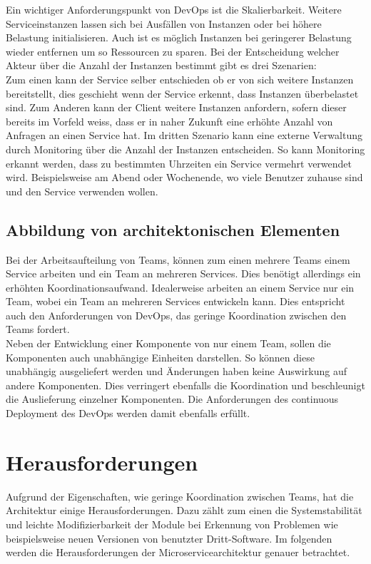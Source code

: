 Ein wichtiger Anforderungspunkt von DevOps ist die Skalierbarkeit. Weitere Serviceinstanzen lassen sich bei Ausfällen von Instanzen oder bei höhere Belastung initialisieren. Auch ist es möglich Instanzen bei geringerer Belastung wieder entfernen um so Ressourcen zu sparen. Bei der Entscheidung welcher Akteur über die Anzahl der Instanzen bestimmt gibt es drei Szenarien:\\
Zum einen kann der Service selber entschieden ob er von sich weitere Instanzen bereitstellt, dies geschieht wenn der Service erkennt, dass Instanzen überbelastet sind. Zum Anderen kann der Client weitere Instanzen anfordern, sofern dieser bereits im Vorfeld weiss, dass er in naher Zukunft eine erhöhte Anzahl von Anfragen an einen Service hat. Im dritten Szenario kann eine externe Verwaltung durch Monitoring über die Anzahl der Instanzen entscheiden. So kann Monitoring erkannt werden, dass zu bestimmten Uhrzeiten ein Service vermehrt verwendet wird. Beispielsweise am Abend oder Wochenende, wo viele Benutzer zuhause sind und den Service verwenden wollen. 

\subsection{Abbildung von architektonischen Elementen}

Bei der Arbeitsaufteilung von Teams, können zum einen mehrere Teams  einem Service arbeiten und ein Team an mehreren Services. Dies benötigt allerdings ein erhöhten Koordinationsaufwand. Idealerweise arbeiten an einem Service nur ein Team, wobei ein Team an mehreren Services entwickeln kann. Dies entspricht auch den Anforderungen von DevOps, das geringe Koordination zwischen den Teams fordert.\\

Neben der Entwicklung einer Komponente von nur einem Team, sollen die Komponenten auch unabhängige Einheiten darstellen. So können diese unabhängig ausgeliefert werden und Änderungen haben keine Auswirkung auf andere Komponenten. Dies verringert ebenfalls die Koordination und beschleunigt die Auslieferung einzelner Komponenten. Die Anforderungen des continuous Deployment des DevOps werden damit ebenfalls erfüllt. 


\section{Herausforderungen}

Aufgrund der Eigenschaften, wie geringe Koordination zwischen Teams, hat die Architektur einige Herausforderungen. Dazu zählt zum einen die Systemstabilität und leichte Modifizierbarkeit der Module bei Erkennung von Problemen wie beispielsweise neuen Versionen von benutzter Dritt-Software. Im folgenden werden die Herausforderungen der Microservicearchitektur genauer betrachtet.


